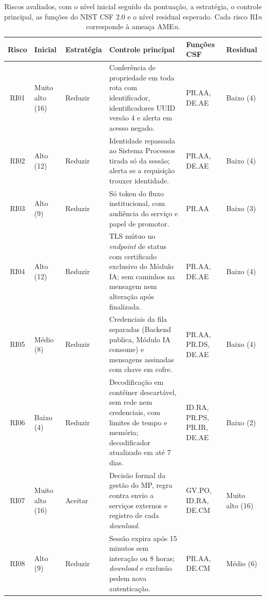 \documentclass[12pt]{article}
\begin{document}
    \begin{table}[htbp]
        \centering
        \caption{Riscos avaliados, com o nível inicial seguido da pontuação, a estratégia, o controle principal, as funções do NIST CSF 2.0 e o nível residual esperado. Cada risco RI\textit{n} corresponde à ameaça AME\textit{n}.}
        \label{tab:riscos}
        \footnotesize
        \setlength{\tabcolsep}{4pt}
        \renewcommand{\arraystretch}{0.92}
        \begin{tabular}{|c|p{1.5cm}|p{1.5cm}|p{5.7cm}|p{1.9cm}|p{1.5cm}|}
            \hline
            \textbf{Risco} & \textbf{Inicial} & \textbf{Estra\-tégia} & \textbf{Controle principal} & \textbf{Funções CSF} & \textbf{Residual} \\
            \hline
            RI01 & Muito alto (16) & Reduzir & Conferência de propriedade em toda rota com identificador, identificadores UUID versão 4 e alerta em acesso negado. & PR.AA, DE.AE & Baixo (4) \\
            \hline
            RI02 & Alto (12) & Reduzir & Identidade repassada ao Sistema Processos tirada só da sessão; alerta se a requisição trouxer identidade. & PR.AA, DE.AE & Baixo (4) \\
            \hline
            RI03 & Alto (9) & Reduzir & Só token do fluxo institucional, com audiência do serviço e papel de promotor. & PR.AA & Baixo (3) \\
            \hline
            RI04 & Alto (12) & Reduzir & TLS mútuo no \textit{endpoint} de status com certificado exclusivo do Módulo IA; sem caminhos na mensagem nem alteração após finalizada. & PR.AA, DE.AE & Baixo (4) \\
            \hline
            RI05 & Médio (8) & Reduzir & Credenciais da fila separadas (Backend publica, Módulo IA consome) e mensagens assinadas com chave em cofre. & PR.AA, PR.DS, DE.AE & Baixo (4) \\
            \hline
            RI06 & Baixo (4) & Reduzir & Decodificação em contêiner descartável, sem rede nem credenciais, com limites de tempo e memória; decodificador atualizado em até 7 dias. & ID.RA, PR.PS, PR.IR, DE.AE & Baixo (2) \\
            \hline
            RI07 & Muito alto (16) & Aceitar & Decisão formal da gestão do MP, regra contra envio a serviços externos e registro de cada \textit{download}. & GV.PO, ID.RA, DE.CM & Muito alto (16) \\
            \hline
            RI08 & Alto (9) & Reduzir & Sessão expira após 15 minutos sem interação ou 8 horas; \textit{download} e exclusão pedem nova autenticação. & PR.AA, DE.CM & Médio (6) \\

\end{tabular}
\end{table}
\end{document}
